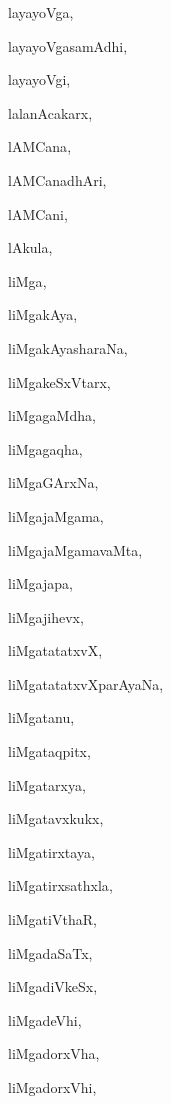 \begin{multicols}{2}
{layayoVga}, \pageref{layayoVga}

{layayoVgasamAdhi}, \pageref{layayoVgasamAdhi}

{layayoVgi}, \pageref{layayoVgi}

{lalanAcakarx}, \pageref{lalanAcakarx}

{lAMCana}, \pageref{lAMCana}

{lAMCanadhAri}, \pageref{lAMCanadhAri}

{lAMCani}, \pageref{lAMCani}

{lAkula}, \pageref{lAkula}

{liMga}, \pageref{liMga}

{liMgakAya}, \pageref{liMgakAya}

{liMgakAyasharaNa}, \pageref{liMgakAyasharaNa}

{liMgakeSxVtarx}, \pageref{liMgakeSxVtarx}

{liMgagaMdha}, \pageref{liMgagaMdha}

{liMgagaqha}, \pageref{liMgagaqha}

{liMgaGArxNa}, \pageref{liMgaGArxNa}

{liMgajaMgama}, \pageref{liMgajaMgama}

{liMgajaMgamavaMta}, \pageref{liMgajaMgamavaMta}

{liMgajapa}, \pageref{liMgajapa}

{liMgajihevx}, \pageref{liMgajihevx}

{liMgatatatxvX}, \pageref{liMgatatatxvX}

{liMgatatatxvXparAyaNa}, \pageref{liMgatatatxvXparAyaNa}

{liMgatanu}, \pageref{liMgatanu}

{liMgataqpitx}, \pageref{liMgataqpitx}

{liMgatarxya}, \pageref{liMgatarxya}

{liMgatavxkukx}, \pageref{liMgatavxkukx}

{liMgatirxtaya}, \pageref{liMgatirxtaya}

{liMgatirxsathxla}, \pageref{liMgatirxsathxla}

{liMgatiVthaR}, \pageref{liMgatiVthaR}

{liMgadaSaTx}, \pageref{liMgadaSaTx}

{liMgadiVkeSx}, \pageref{liMgadiVkeSx}

{liMgadeVhi}, \pageref{liMgadeVhi}

{liMgadorxVha}, \pageref{liMgadorxVha}

{liMgadorxVhi}, \pageref{liMgadorxVhi}


\end{multicols}
